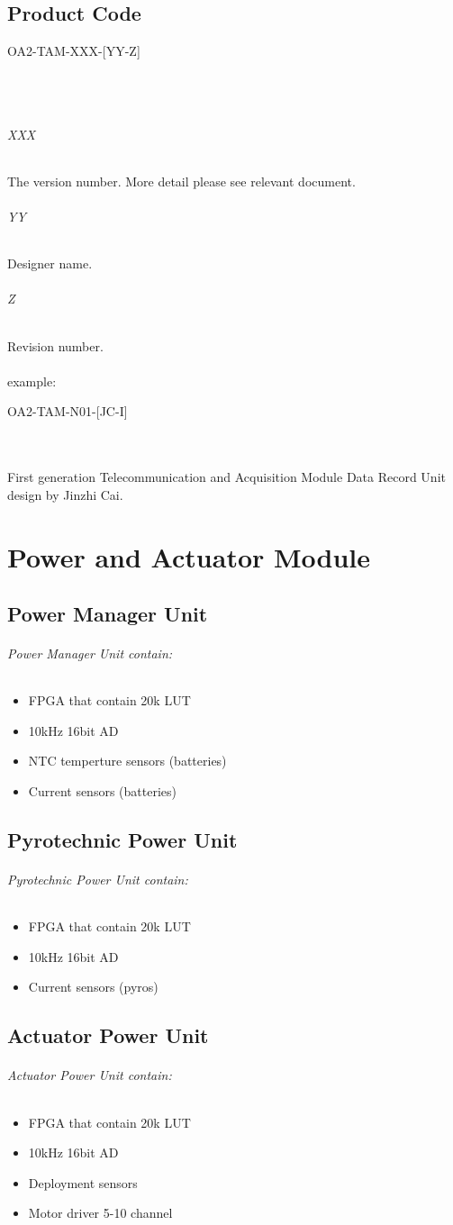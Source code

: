\documentclass[12pt,article]{memoir}
\begin{document}
\section{Product Code}
\begin{LARGE}
OA2-TAM-XXX-[YY-Z]
\end{LARGE}\\\\
\subparagraph{XXX}
The version number. More detail please see relevant document.
\subparagraph{YY}
Designer name.
\subparagraph{Z}
Revision number.\\\\
example: 
\begin{large}
OA2-TAM-N01-[JC-I]
\end{large}\\\\
First generation Telecommunication and Acquisition Module Data Record Unit design by Jinzhi Cai.
\newpage
\newpage
\chapter{Power and Actuator Module}
\section{Power Manager Unit}
\subparagraph{Power Manager Unit contain:}
\begin{itemize}
	\item FPGA that contain 20k LUT
	\item 10kHz 16bit AD
	\item NTC temperture sensors  (batteries)
	\item Current sensors  (batteries)
\end{itemize}
\section{Pyrotechnic Power Unit}
\subparagraph{Pyrotechnic Power Unit contain:}
\begin{itemize}
	\item FPGA that contain 20k LUT
	\item 10kHz 16bit AD
	\item Current sensors  (pyros)
\end{itemize}
\section{Actuator Power Unit}
\subparagraph{Actuator Power Unit contain:}
\begin{itemize}
	\item FPGA that contain 20k LUT
	\item 10kHz 16bit AD
	\item Deployment sensors 
	\item Motor driver 5-10 channel
\end{itemize}
\end{document}
